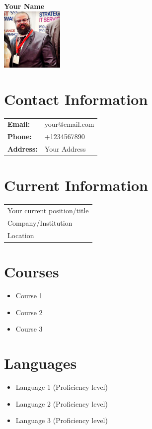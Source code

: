 \documentclass[letterpaper,10pt]{article}
\begin{document}
	
	\begin{minipage}[t]{0.3\textwidth}
		\begin{center}
			\Large\textbf{Your Name}\\[2ex]
			\includegraphics[width=3cm,height=3cm]{your_photo.jpg} %
		\end{center}
		
		\section*{Contact Information}
		\begin{tabular}{@{}l l}
			\textbf{Email:} & your@email.com \\
			\textbf{Phone:} & +1234567890 \\
			\textbf{Address:} & Your Address \\
		\end{tabular}
		
		\section*{Current Information}
		\begin{tabular}{@{}l}
			Your current position/title \\
			Company/Institution \\
			Location \\
		\end{tabular}
		
		\section*{Courses}
		\begin{itemize}
			\item Course 1
			\item Course 2
			\item Course 3
		\end{itemize}
		
		\section*{Languages}
		\begin{itemize}
			\item Language 1 (Proficiency level)
			\item Language 2 (Proficiency level)
			\item Language 3 (Proficiency level)
		\end{itemize}
	\end{minipage}
\end{document}
